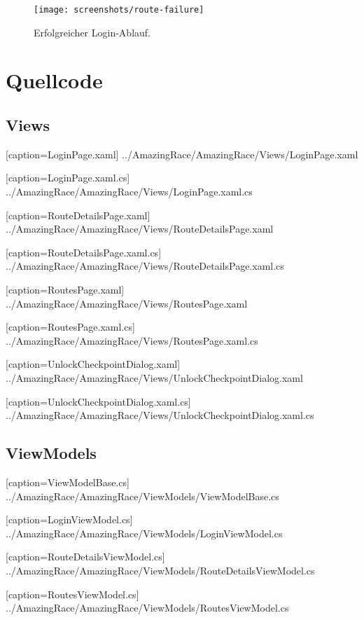 \documentclass[a4paper,ngerman]{scrartcl}
\begin{document}
\begin{figure}[h]
\centering
\texttt{[image: screenshots/route-failure]}
\caption{Erfolgreicher Login-Ablauf.}
\label{fig:GraphDb}
\end{figure}


\newpage
\section{Quellcode}

\subsection{Views}

[caption=LoginPage.xaml]
{../AmazingRace/AmazingRace/Views/LoginPage.xaml}


[caption=LoginPage.xaml.cs]
{../AmazingRace/AmazingRace/Views/LoginPage.xaml.cs}


[caption=RouteDetailsPage.xaml]
{../AmazingRace/AmazingRace/Views/RouteDetailsPage.xaml}


[caption=RouteDetailsPage.xaml.cs]
{../AmazingRace/AmazingRace/Views/RouteDetailsPage.xaml.cs}


[caption=RoutesPage.xaml]
{../AmazingRace/AmazingRace/Views/RoutesPage.xaml}


[caption=RoutesPage.xaml.cs]
{../AmazingRace/AmazingRace/Views/RoutesPage.xaml.cs}


[caption=UnlockCheckpointDialog.xaml]
{../AmazingRace/AmazingRace/Views/UnlockCheckpointDialog.xaml}


[caption=UnlockCheckpointDialog.xaml.cs]
{../AmazingRace/AmazingRace/Views/UnlockCheckpointDialog.xaml.cs}


\subsection{ViewModels}

[caption=ViewModelBase.cs]
{../AmazingRace/AmazingRace/ViewModels/ViewModelBase.cs}


[caption=LoginViewModel.cs]
{../AmazingRace/AmazingRace/ViewModels/LoginViewModel.cs}


[caption=RouteDetailsViewModel.cs]
{../AmazingRace/AmazingRace/ViewModels/RouteDetailsViewModel.cs}


[caption=RoutesViewModel.cs]
{../AmazingRace/AmazingRace/ViewModels/RoutesViewModel.cs}
\end{document}
